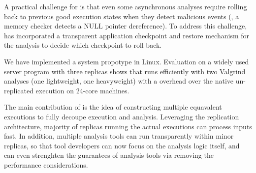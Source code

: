 A practical challenge for \xxx is that even some asynchronous analyses require 
rolling back to previous good execution states when they detect malicious 
events (\eg, a memory checker detects a NULL pointer dereference). To address 
this challenge, \xxx has incorporated a transparent application checkpoint and 
restore mechanism for the analysis to decide which checkpoint to roll back.


We have implemented a \xxx system propotype in Linux. Evaluation on a widely 
used server program \clamav with three replicas shows that \xxx runs 
efficiently with two Valgrind analyses (one lightweight, one heavyweight) with 
a overhead \overhead over the native un-replicated execution on 24-core 
machines.







The main contribution of \xxx is the idea of constructing multiple equavalent 
executions to fully decoupe execution and analysis. Leveraging the replication 
architecture, majority of replicas running the actual executions can process 
inputs fast. In addition, multiple analysis tools can run transparently within 
minor replicas, so that tool developers can now focus on the analysis logic 
itself, and can even strenghten the guarantees of analysis tools via removing 
the performance considerations.




